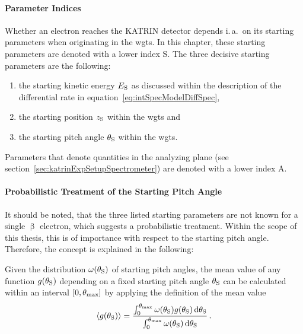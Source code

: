 \paragraph{Parameter Indices}
Whether an electron reaches the KATRIN detector depends i.\,a.~on its starting parameters when originating in the \gls{wgts}. In this chapter, these starting parameters are denoted with a lower index $\mathrm{S}$. The three decisive starting parameters are the following:
\begin{enumerate}
	\item the starting kinetic energy $E_\mathrm{S}$ as discussed within the description of the differential rate in equation~\eqref{eq:intSpecModelDiffSpec},	
	\item the starting position $z_\mathrm{S}$ within the \gls{wgts} and
	\item the starting pitch angle $\theta_\mathrm{S}$ within the \gls{wgts}.
\end{enumerate}
Parameters that denote quantities in the analyzing plane (see section~\ref{sec:katrinExpSetupSpectrometer}) are denoted with a lower index $\mathrm{A}$.

\paragraph{Probabilistic Treatment of  the Starting Pitch Angle}
It should be noted, that the three listed starting parameters are not known for a single $\upbeta$ electron, which suggests a probabilistic treatment. Within the scope of this thesis, this is of importance with respect to the starting pitch angle. Therefore, the concept is explained in the following:

Given the distribution $\omega(\theta_\mathrm{S})$ of starting pitch angles, the mean value of any function $g(\theta_\mathrm{S})$ depending on a fixed starting pitch angle $\theta_\mathrm{S}$ can be calculated within an interval $[0, \theta_\mathrm{max}]$ by applying the definition of the mean value
\begin{equation}
\label{eq:intSpecModelPitchAngleAveraging}
\left\langle{g(\theta_\mathrm{S})}\right\rangle = 
\frac{
	\int_{0}^{\theta_\mathrm{max}} 
	\omega(\theta_\mathrm{S})
	g(\theta_\mathrm{S})
	\mathop{}\!\mathrm{d} \theta_\mathrm{S}   
}{
	\int_{0}^{\theta_\mathrm{max}} 
	\omega(\theta_\mathrm{S})
	\mathop{}\!\mathrm{d} \theta_\mathrm{S} 
} \text{\,.}
\end{equation}

